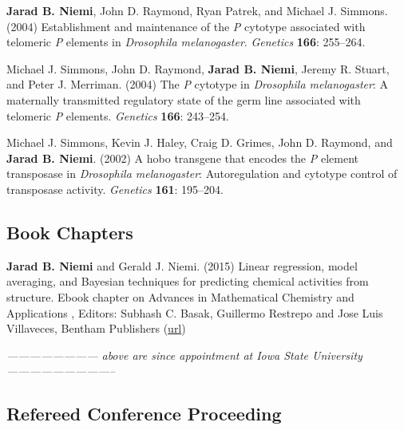 \documentclass[overlapped,line]{res}
\begin{document}
\begin{resume}
{\bf Jarad B. Niemi}, John D. Raymond, Ryan Patrek, and Michael J. Simmons. (2004) Establishment and maintenance of the \emph{P} cytotype associated with telomeric \emph{P} elements in \emph{Drosophila melanogaster}. \emph{Genetics} {\bf 166}: 255--264.

Michael J. Simmons, John D. Raymond, {\bf Jarad B. Niemi}, Jeremy R. Stuart, and Peter J. Merriman. (2004) The \emph{P} cytotype in \emph{Drosophila melanogaster}: A maternally transmitted regulatory state of the germ line associated with telomeric \emph{P} elements. \emph{Genetics} {\bf 166}: 243--254.


Michael J. Simmons, Kevin J. Haley, Craig D. Grimes, John D. Raymond, and {\bf Jarad B. Niemi}. (2002) A hobo transgene that encodes the \emph{P} element transposase in \emph{Drosophila melanogaster}: Autoregulation and cytotype control of transposase activity. \emph{Genetics} {\bf 161}: 195--204.





\subsection{\bf Book Chapters} \vspace{-0.2in}

{\bf Jarad B. Niemi} and Gerald J. Niemi. (2015) Linear regression, model averaging, and Bayesian techniques for predicting chemical activities from structure. Ebook chapter on Advances in Mathematical Chemistry and Applications
, Editors: Subhash C. Basak, Guillermo Restrepo and Jose Luis Villaveces, Bentham Publishers (\href{http://www.eurekaselect.com/132675/chapter/linear-regression%2C-model-averaging%2C-and-bayesian-techniques-for-predicting-chemical-activities-from-structur}{url})

\emph{------------------------ above are since appointment at Iowa State University -----------------------------}

\subsection{\bf Refereed Conference Proceeding} \vspace{-0.2in}


\end{resume}
\end{document}
